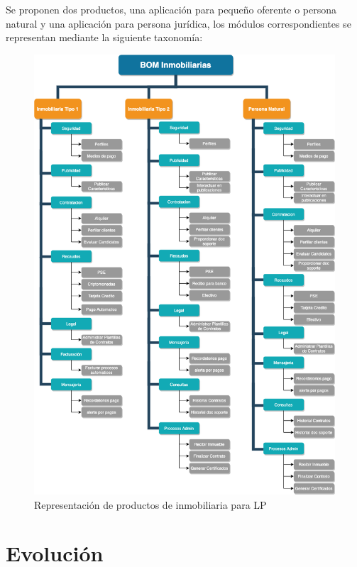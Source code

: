 \documentclass[letterpaper]{article}
\begin{document}
Se proponen dos productos, una aplicación para pequeño oferente o persona natural y una aplicación para persona jurídica, los módulos correspondientes se representan mediante la siguiente taxonomía:
\begin{figure}[ht]
    \centering
    \includegraphics[scale=0.5]{images/BOM LP Inmobiliarias.png}
    \caption{Representación de productos de inmobiliaria para LP }
    \label{LPE}
\end{figure}
\FloatBarrier




\section{\textbf{Evolución}}
\end{document}
